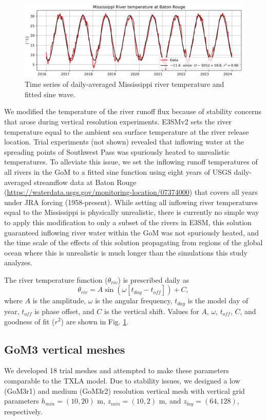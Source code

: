 \begin{figure}[t]
\centerline{\includegraphics[width=\textwidth]{figures/scgsr/Miss_temp.jpg}}
    \caption{Time series of daily-averaged Mississippi river temperature and fitted sine wave.}
    \label{fig:miss_temp}
\end{figure}

We modified the temperature of the river runoff flux because of stability concerns that arose during vertical resolution experiments. E3SMv2 sets the river temperature equal to the ambient sea surface temperature at the river release location. Trial experiments (not shown) revealed that inflowing water at the spreading points of Southwest Pass was spuriously heated to unrealistic temperatures. To alleviate this issue, we set the inflowing runoff temperatures of all rivers in the GoM to a fitted sine function using eight years of USGS daily-averaged streamflow data at Baton Rouge (\url{https://waterdata.usgs.gov/monitoring-location/07374000}) that covers all years under JRA forcing (1958-present). While setting all inflowing river temperatures equal to the Mississippi is physically unrealistic, there is currently no simple way to apply this modification to only a subset of the rivers in E3SM, this solution guaranteed inflowing river water within the GoM was not spuriously heated, and the time scale of the effects of this solution propagating from regions of the global ocean where this is unrealistic is much longer than the simulations this study analyzes. 

The river temperature function ($\theta_{riv}$) is prescribed daily as
\begin{equation}
    \theta_{riv} = A \sin (\omega [t_{day}-t_{off}] ) + C, 
\end{equation}
where $A$ is the amplitude, $\omega$ is the angular frequency, $t_{day}$ is the model day of year, $t_{off}$ is phase offset, and $C$ is the vertical shift. Values for $A$, $\omega$, $t_{off}$, $C$, and goodness of fit ($r^2$) are shown in Fig. \ref{fig:miss_temp}. 

\subsection{GoM3 vertical meshes} \label{sec:vertical_mesh}
We developed 18 trial meshes and attempted to make these parameters comparable to the TXLA model. Due to stability issues, we designed a low (GoM3r1) and medium (GoM3r2) resolution vertical mesh with vertical grid parameters $h_{min} = (10,20)$ m, $z_{min} = (10,2)$ m, and $z_{lay} = (64,128)$, respectively. 

